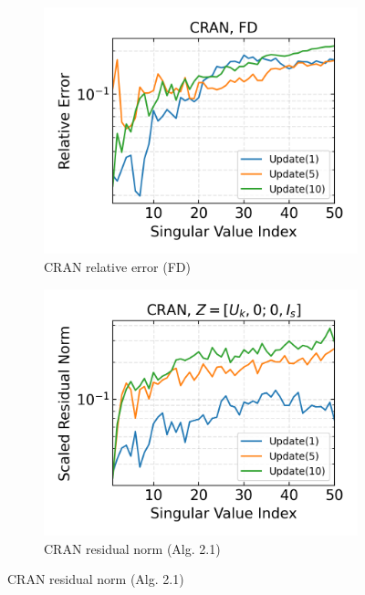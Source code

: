 \begin{figure}[h]
\begin{subfigure}[b]{0.32\textwidth}
  \end{subfigure}
  \hfill
  \begin{subfigure}[b]{0.32\textwidth}
    \centering
    \includegraphics[width=\textwidth]{../openreview/figures/report_figures/CRAN_frequent-directions_n_batches_10_k_dims_50_rel_err.png}
    \caption{CRAN relative error (FD)}
    \label{fig:cran_rel_err_fd}
  \end{subfigure}
  \begin{subfigure}[b]{0.32\textwidth}
    \centering
    \includegraphics[width=\textwidth]{../openreview/figures/report_figures/CRAN_zha-simon_n_batches_10_k_dims_50_res_norm.png}
    \caption{CRAN residual norm (Alg. 2.1)}

\end{subfigure}
\end{figure}
